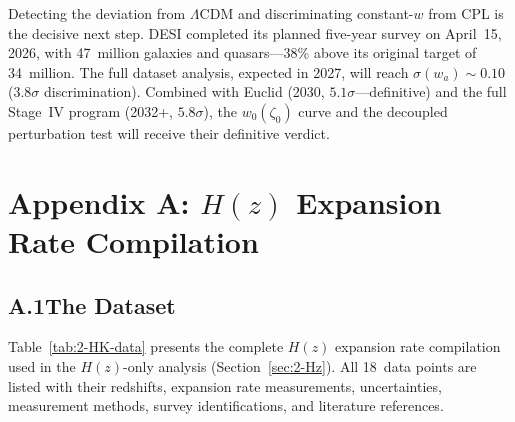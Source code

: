 Detecting the deviation from $\Lambda$CDM and discriminating constant-$w$ from CPL is the decisive next step. DESI completed its planned five-year survey on April~15, 2026, with 47~million galaxies and quasars---38\% above its original target of 34~million. The full dataset analysis, expected in 2027, will reach $\sigma(w_a) \sim 0.10$ ($3.8\sigma$ discrimination). Combined with Euclid (2030, $5.1\sigma$---definitive) and the full Stage~IV program (2032+, $5.8\sigma$), the $w_0(\zeta_0)$ curve and the decoupled perturbation test will receive their definitive verdict.

\section*{Appendix A: $H(z)$ Expansion Rate Compilation}
\label{sec:2-appendixA}

\subsection*{A.1\quad The Dataset}
\label{sec:2-appA-data}

Table~\ref{tab:2-HK-data} presents the complete $H(z)$ expansion rate compilation used in the $H(z)$-only analysis (Section~\ref{sec:2-Hz}). All 18~data points are listed with their redshifts, expansion rate measurements, uncertainties, measurement methods, survey identifications, and literature references.

